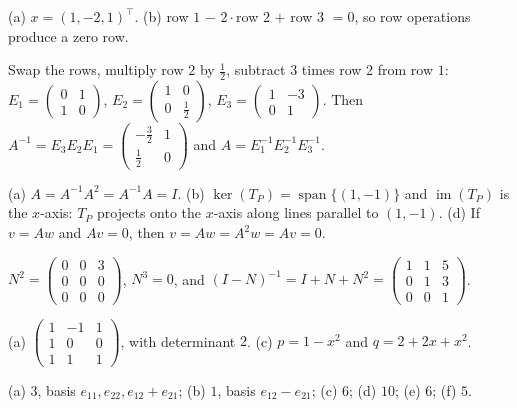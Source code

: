 \documentclass[11pt]{article}
\theoremstyle{definition}
\DeclareMathOperator{\im}{im}
\DeclareMathOperator{\Span}{span}
\begin{document}
\begin{description}[leftmargin=0pt, itemsep=0.3em]
    \item[\ref{pr:arithmetic}.] (a) $x = (1, -2, 1)^\top$. (b) row $1$ $-$ $2\cdot$row $2$ $+$ row $3$ $= 0$, so row operations produce a zero row.
    \item[\ref{pr:elementary}.] Swap the rows, multiply row $2$ by $\frac{1}{2}$, subtract $3$ times row $2$ from row $1$: $E_1 = \begin{pmatrix} 0 & 1 \\ 1 & 0 \end{pmatrix}$, $E_2 = \begin{pmatrix} 1 & 0 \\ 0 & \frac{1}{2} \end{pmatrix}$, $E_3 = \begin{pmatrix} 1 & -3 \\ 0 & 1 \end{pmatrix}$. Then $A^{-1} = E_3 E_2 E_1 = \begin{pmatrix} -\frac{3}{2} & 1 \\ \frac{1}{2} & 0 \end{pmatrix}$ and $A = E_1^{-1} E_2^{-1} E_3^{-1}$.
    \item[\ref{pr:idempotent}.] (a) $A = A^{-1}A^2 = A^{-1}A = I$. (b) $\ker(T_P) = \Span\{(1, -1)\}$ and $\im(T_P)$ is the $x$-axis: $T_P$ projects onto the $x$-axis along lines parallel to $(1, -1)$. (d) If $v = Aw$ and $Av = 0$, then $v = Aw = A^2 w = Av = 0$.
    \item[\ref{pr:nilpotent}.] $N^2 = \begin{pmatrix} 0 & 0 & 3 \\ 0 & 0 & 0 \\ 0 & 0 & 0 \end{pmatrix}$, $N^3 = 0$, and $(I - N)^{-1} = I + N + N^2 = \begin{pmatrix} 1 & 1 & 5 \\ 0 & 1 & 3 \\ 0 & 0 & 1 \end{pmatrix}$.
    \item[\ref{pr:interpolation}.] (a) $\begin{pmatrix} 1 & -1 & 1 \\ 1 & 0 & 0 \\ 1 & 1 & 1 \end{pmatrix}$, with determinant $2$. (c) $p = 1 - x^2$ and $q = 2 + 2x + x^2$.
    \item[\ref{pr:dims-special}.] (a) $3$, basis $e_{11}, e_{22}, e_{12} + e_{21}$; (b) $1$, basis $e_{12} - e_{21}$; (c) $6$; (d) $10$; (e) $6$; (f) $5$.

\end{description}
\end{document}
